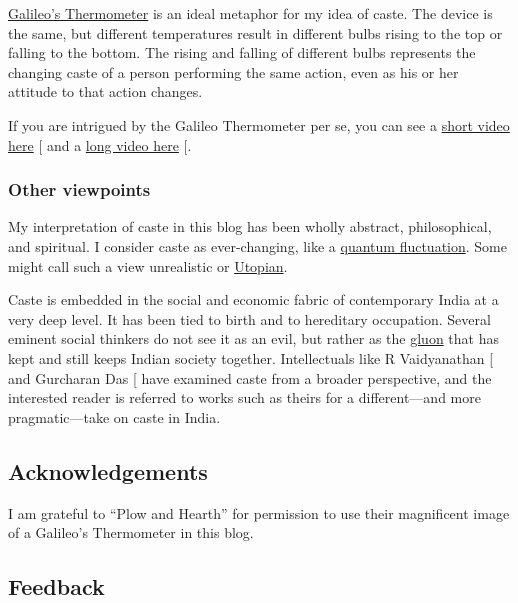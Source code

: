 \documentclass[
  a4paper,
]{article}
\begin{document}
\href{https://en.wikipedia.org/wiki/Galileo_thermometer}{Galileo's
Thermometer} is an ideal metaphor for my idea of caste. The device is
the same, but different temperatures result in different bulbs rising to
the top or falling to the bottom. The rising and falling of different
bulbs represents the changing caste of a person performing the same
action, even as his or her attitude to that action changes.

If you are intrigued by the Galileo Thermometer per se, you can see a
\href{https://youtube.com/shorts/kkQ1TFr4apg?si=V7W3fbIZLpQ2p4ud}{short
video here} {[}\citeproc{ref-galileo-YT-short}{1}{]} and a
\href{https://www.youtube.com/watch?v=XeSlFxOHW6A}{long video here}
{[}\citeproc{ref-galileo-YT-long}{2}{]}.

\subsubsection{Other viewpoints}\label{other-viewpoints}

My interpretation of caste in this blog has been wholly abstract,
philosophical, and spiritual. I consider caste as ever-changing, like a
\href{https://en.wikipedia.org/wiki/Quantum_fluctuation}{quantum
fluctuation}. Some might call such a view unrealistic or
\href{https://www.etymonline.com/search?q=Utopia}{Utopian}.

Caste is embedded in the social and economic fabric of contemporary
India at a very deep level. It has been tied to birth and to hereditary
occupation. Several eminent social thinkers do not see it as an evil,
but rather as the \href{https://en.wikipedia.org/wiki/Gluon}{gluon} that
has kept and still keeps Indian society together. Intellectuals like R
Vaidyanathan {[}\citeproc{ref-rv-caste}{3}{]} and Gurcharan Das
{[}\citeproc{ref-das-dharma}{4}{]} have examined caste from a broader
perspective, and the interested reader is referred to works such as
theirs for a different---and more pragmatic---take on caste in India.

\subsection{Acknowledgements}\label{acknowledgements}

I am grateful to ``Plow and Hearth'' for permission to use their
magnificent image of a Galileo's Thermometer in this blog.

\subsection{Feedback}\label{feedback}
\end{document}

